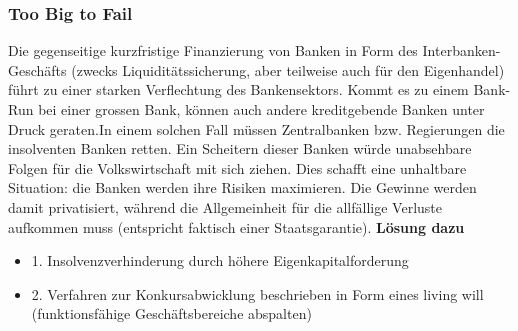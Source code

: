 \subsubsection{Too Big to Fail}
Die gegenseitige kurzfristige Finanzierung von Banken in Form des Interbanken-Geschäfts (zwecks Liquiditätssicherung, aber teilweise auch für den Eigenhandel) führt zu einer starken Verflechtung des Bankensektors. Kommt es zu einem Bank-Run bei einer grossen Bank, können auch andere kreditgebende Banken unter Druck geraten.In einem solchen Fall müssen Zentralbanken bzw. Regierungen die insolventen Banken retten. Ein Scheitern dieser Banken würde unabsehbare Folgen für die Volkswirtschaft mit sich ziehen. Dies schafft eine unhaltbare Situation: die Banken werden ihre Risiken maximieren. Die Gewinne werden damit privatisiert, während die Allgemeinheit für die allfällige Verluste aufkommen muss (entspricht faktisch einer Staatsgarantie).
\textbf{Lösung dazu}\\
\begin{itemize}
	\item 1. Insolvenzverhinderung durch höhere Eigenkapitalforderung
	\item 2. Verfahren zur Konkursabwicklung beschrieben in Form eines living will (funktionsfähige Geschäftsbereiche abspalten)
\end{itemize}

